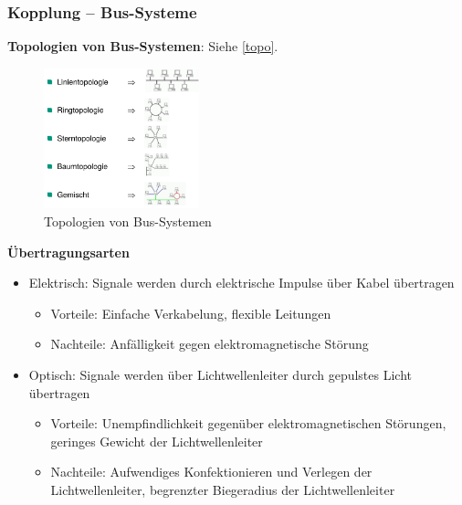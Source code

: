 \subsubsection{Kopplung – Bus-Systeme}
\textbf{Topologien von Bus-Systemen}: Siehe \autoref{topo}.\\  
\begin{figure}[h!]
	\centering
	\includegraphics[width=0.4\textwidth]{figures/ch07_bus-topo.png}
	\caption{Topologien von Bus-Systemen}
	\label{topo}
\end{figure}

\textbf{Übertragungsarten}
\begin{itemize}
\item Elektrisch: Signale werden durch elektrische Impulse über Kabel übertragen
\begin{itemize}
\item Vorteile: Einfache Verkabelung, flexible Leitungen
\item Nachteile: Anfälligkeit gegen elektromagnetische Störung
\end{itemize}
\item Optisch: Signale werden über Lichtwellenleiter durch gepulstes Licht übertragen
\begin{itemize}
\item Vorteile: Unempfindlichkeit gegenüber elektromagnetischen Störungen, geringes Gewicht der Lichtwellenleiter
\item Nachteile: Aufwendiges Konfektionieren und Verlegen der Lichtwellenleiter, begrenzter Biegeradius der Lichtwellenleiter
\end{itemize}
\end{itemize}

